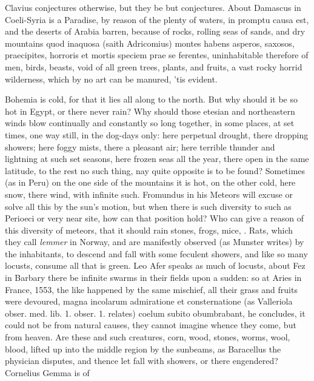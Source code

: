 {Clavius conjectures otherwise, but they be but conjectures. About
Damascus in Coeli-Syria is a Paradise, by reason of the plenty of
waters, in promptu causa est, and the deserts of Arabia barren, because
of rocks, rolling seas of sands, and dry mountains quod inaquosa (saith
Adricomius) montes habens asperos, saxosos, praecipites, horroris et
mortis speciem prae se ferentes, uninhabitable therefore of men, birds,
beasts, void of all green trees, plants, and fruits, a vast rocky
horrid wilderness, which by no art can be manured, 'tis evident.

Bohemia is cold, for that it lies all along to the north. But why
should it be so hot in Egypt, or there never rain? Why should those
etesian and northeastern winds blow continually and constantly so
long together, in some places, at set times, one way still, in the
dog-days only: here perpetual drought, there dropping showers; here
foggy mists, there a pleasant air; here terrible thunder and
lightning at such set seasons, here frozen seas all the year, there
open in the same latitude, to the rest no such thing, nay quite
opposite is to be found? Sometimes (as in Peru) on the one side
of the mountains it is hot, on the other cold, here snow, there wind,
with infinite such. Fromundus in his Meteors will excuse or solve all
this by the sun's motion, but when there is such diversity to such as
Perioeci or very near site, how can that position hold?
Who can give a reason of this diversity of meteors, that it should rain
stones, frogs, mice, \etc{}. Rats, which they call \emph{lemmer} in
Norway, and are manifestly observed (as Munster writes) by the
inhabitants, to descend and fall with some feculent showers, and like
so many locusts, consume all that is green. Leo Afer speaks as much of
locusts, about Fez in Barbary there be infinite swarms in their fields
upon a sudden: so at Aries in France, 1553, the like happened by the
same mischief, all their grass and fruits were devoured, magna
incolarum admiratione et consternatione (as Valleriola obser. med. lib.
1. obser. 1. relates) coelum subito obumbrabant, \etc{} he concludes,
it could not be from natural causes, they cannot imagine whence
they come, but from heaven. Are these and such creatures, corn, wood,
stones, worms, wool, blood, \etc{} lifted up into the middle region by the
sunbeams, as Baracellus the physician disputes, and thence let
fall with showers, or there engendered? Cornelius Gemma is of
}
